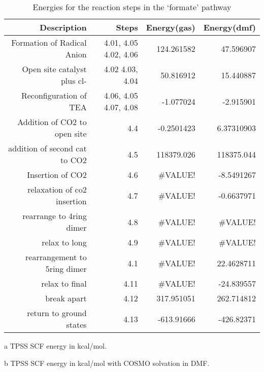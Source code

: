 \begin{table}[!htb]
\centering
 \begin{threeparttable}
  \caption{Energies for the reaction steps in the `formate' pathway}
    \begin{tabular}{rrrr}
    \toprule
    Description & Steps & Energy(gas)\tnote{a} & Energy(dmf)\tnote{b} \\
    \midrule
    Formation of Radical Anion & 4.01, 4.05 \ce{->} 4.02, 4.06   & 124.261582 & 47.596907 \\
    Open site catalyst plus cl- & 4.02 \ce{->} 4.03, 4.04 & 50.816912 & 15.440887 \\
    Reconfiguration of TEA & 4.06, 4.05 \ce{->} 4.07, 4.08 & -1.077024 & -2.915901 \\
    \midrule
    Addition of CO2 to open site & 4.4   & -0.2501423 & 6.37310903 \\
    addition of second cat to CO2 & 4.5   & 118379.026 & 118375.044 \\
    Insertion of CO2 & 4.6   & \#VALUE! & -8.5491267 \\
    relaxation of co2 insertion & 4.7   & \#VALUE! & -0.6637971 \\
    rearrange to 4ring dimer & 4.8   & \#VALUE! & \#VALUE! \\
    relax to long & 4.9   & \#VALUE! & \#VALUE! \\
    rearrangement to 5ring dimer & 4.1   & \#VALUE! & 22.4628711 \\
    relax to final & 4.11  & \#VALUE! & -24.839557 \\
    break apart & 4.12  & 317.951051 & 262.714812 \\
    return to ground states & 4.13  & -613.91666 & -426.82371 \\
    \bottomrule
    \end{tabular}%
    \begin{tablenotes}
    \item [a] TPSS SCF energy in kcal/mol.
    \item [b] TPSS SCF energy in kcal/mol with COSMO solvation in DMF.
    \end{tablenotes}
  \label{tab.carbrxn}%
 \end{threeparttable}
\end{table}%
